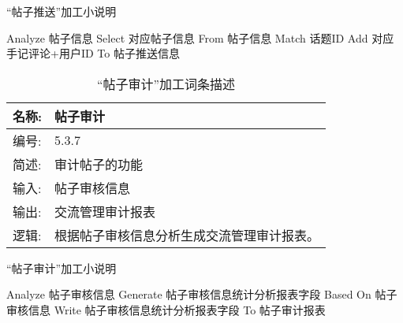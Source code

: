 \begin{algorithm}[H]
    \renewcommand{\thealgorithm}{}
    \caption{“帖子推送”加工小说明} 
    \label{alg3} 
    \begin{algorithmic}[1]
        \STATE Analyze 帖子信息
        \STATE Select 对应帖子信息 From 帖子信息 Match 话题ID
        \STATE Add 对应手记评论+用户ID To 帖子推送信息
        \ENDFOR
    \end{algorithmic} 
\end{algorithm}

\begin{table}[H]  
\caption{“帖子审计”加工词条描述}  
\begin{center}  
    \begin{tabular}{l p{11cm}} 
        \hline
        \quad 名称:  & 帖子审计 \\
        \hline
        \quad 编号:  & 5.3.7 \\
        \hline
        \quad 简述:  & 审计帖子的功能 \\
        \hline
        \quad 输入:  & 帖子审核信息 \\
        \hline
        \quad 输出:  & 交流管理审计报表 \\
        \hline
        \quad 逻辑:  & 根据帖子审核信息分析生成交流管理审计报表。 \\
        \hline
    \end{tabular}
    \label{tab1}
\end{center}
\end{table}

\begin{algorithm}[H]
    \renewcommand{\thealgorithm}{}
    \caption{“帖子审计”加工小说明} 
    \label{alg3} 
    \begin{algorithmic}[1]
        \STATE Analyze 帖子审核信息
        \STATE Generate 帖子审核信息统计分析报表字段 Based On 帖子审核信息
        \STATE Write 帖子审核信息统计分析报表字段 To 帖子审计报表
    \end{algorithmic} 
\end{algorithm}